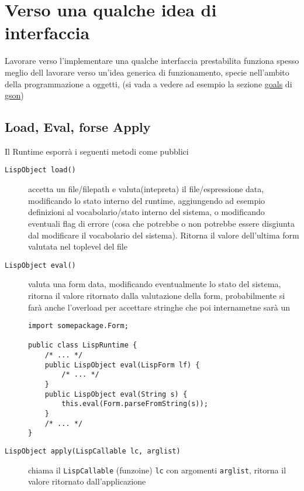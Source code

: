 \documentclass[11pt]{article}
\begin{document}
\section{Verso una qualche idea di interfaccia}
\label{sec:orgcbcd5ff}
Lavorare verso l'implementare una qualche interfaccia prestabilita funziona spesso meglio dell lavorare verso un'idea generica di funzionamento, specie nell'ambito della programmazione a oggetti, (si vada a vedere ad esempio la sezione \href{https://github.com/google/gson\#goals}{goals} di \href{https://github.com/google/gson}{gson})

\subsection{Load, Eval, forse Apply}
\label{sec:org37ff51f}
Il Runtime esporrà i seguenti metodi come pubblici
\begin{description}
\item[{\texttt{LispObject load()}}] accetta un file/filepath e valuta(intepreta) il file/espressione data, modificando lo stato interno del runtime, aggiungendo ad esempio definizioni al vocabolario/stato interno del sistema, o modificando eventuali flag di errore (cosa che potrebbe o non potrebbe essere disgiunta dal modificare il vocabolario del sistema). Ritorna il valore dell'ultima form valutata nel toplevel del file
\item[{\texttt{LispObject eval()}}] valuta una form data, modificando eventualmente lo stato del sistema, ritorna il valore ritornato dalla valutazione della form, probabilmente si farà anche l'overload per accettare stringhe che poi internametne sarà un
\begin{verbatim}
import somepackage.Form;

public class LispRuntime {
    /* ... */
    public LispObject eval(LispForm lf) {
        /* ... */
    }
    public LispObject eval(String s) {
        this.eval(Form.parseFromString(s));
    }
    /* ... */
}
\end{verbatim}
\end{description}


\begin{description}
\item[{\texttt{LispObject apply(LispCallable lc, arglist)}\footnotemark}] chiama il \texttt{LispCallable} (funzoine) \texttt{lc} con argomenti \texttt{arglist}, ritorna il valore ritornato dall'applicazione
\end{description}
\end{document}
